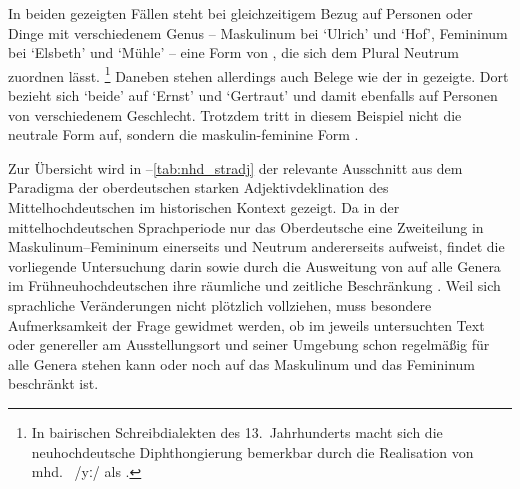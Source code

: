 In beiden gezeigten Fällen steht bei gleichzeitigem Bezug auf Personen oder
Dinge mit verschiedenem Genus -- Maskulinum bei  `Ulrich' und
 `Hof', Femininum bei  `Elsbeth' und 
`Mühle' -- eine Form von , die sich dem Plural Neutrum
 zuordnen lässt.%
%
	\footnote{In bairischen Schreibdialekten des
		13.~Jahrhunderts macht sich die neuhochdeutsche Diphthongierung
		bemerkbar durch die Realisation von
		mhd.~ /yː/ als 
		\autocites[74--77]{paul2007}. }
%
Daneben stehen allerdings auch Belege wie der in  gezeigte.
Dort bezieht sich  `beide' auf  `Ernst' und
 `Gertraut' und damit ebenfalls auf Personen von
verschiedenem Geschlecht. Trotzdem tritt in diesem Beispiel nicht die neutrale
Form  auf, sondern die maskulin-feminine Form .


Zur Übersicht wird in --\ref{tab:nhd_stradj} der
relevante Ausschnitt aus dem Paradigma der oberdeutschen starken
Adjektivdeklination des Mittelhochdeutschen im
historischen Kontext gezeigt. Da in der
mittelhochdeutschen Sprachperiode nur das
Oberdeutsche eine Zweiteilung in Maskulinum--Femininum
einerseits und Neutrum andererseits aufweist, findet die vorliegende
Untersuchung darin sowie durch die Ausweitung von  auf alle Genera im
Früh\-neu\-hoch\-deutschen ihre räumliche und zeitliche
Beschränkung \autocites[vgl.][191--192]{reichmannwegera1993}[181--184]{ksw2}.
Weil sich sprachliche Veränderungen nicht plötzlich vollziehen, muss besondere
Aufmerksamkeit der Frage gewidmet werden, ob  im jeweils untersuchten
Text oder genereller am Ausstellungsort und seiner Umgebung schon regelmäßig
für alle Genera stehen kann oder noch auf das Maskulinum und das Femininum
beschränkt ist.

